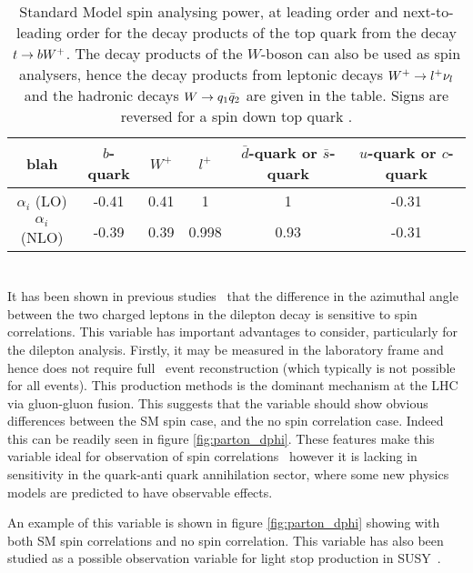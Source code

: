 \begin{table}[htbp]
\begin{center}
\begin{tabular}{|c||c|c||c||c|c|}
\hline
blah & $b$-quark & $W^+$ & $l^+$ & $\bar{d}$-quark or $\bar{s}$-quark& $u$-quark or $c$-quark\\
\hline
$\alpha_i$ (LO) & -0.41 & 0.41 & 1 & 1 & -0.31 \\
$\alpha_i$ (NLO) & -0.39 & 0.39 & 0.998 & 0.93 & -0.31 \\
\hline
\end{tabular}
\end{center}
\caption{Standard Model spin analysing power, at leading order and next-to-leading order 
for the decay products of the top quark from the decay $t \rightarrow bW^+$.  The decay products of the $W$-boson 
can also be used as spin analysers, hence the decay products from leptonic decays 
$W^+ \rightarrow l^+\nu_l$ and the hadronic decays $W \rightarrow q_1\bar{q}_2$ are given in the table.  
Signs are reversed for a spin down top quark \cite{hubaut, Czarnecki:1990pe, Brandenburg:2002xr}.}
\label{tab:alphas}
\end{table}

\section{\dphi}
It has been shown in previous studies~\cite{mahlon2010,atlasspinprl} that the difference in the azimuthal angle between the two charged leptons in the dilepton decay is sensitive to spin correlations. This variable has important advantages to consider, particularly for the dilepton analysis. Firstly, it may be measured in the laboratory frame and hence does not require full \ttbar\ event reconstruction (which typically is not possible for all events). This production methods is the dominant mechanism at the LHC via gluon-gluon fusion. This suggests that the \dphi variable should show obvious differences between the SM spin case, and the no spin correlation case. Indeed this can be readily seen in figure \ref{fig:parton_dphi}.  These features make this variable ideal for observation of spin correlations~\cite{atlasspinprl}  however it is lacking in sensitivity in the quark-anti quark annihilation sector, where some new physics models are predicted to have observable effects.

An example of this variable is shown in figure \ref{fig:parton_dphi} showing \dphi with both SM spin correlations and no spin correlation. This variable has also been studied as a possible observation variable for light stop production in SUSY~\cite{lightstop}.

